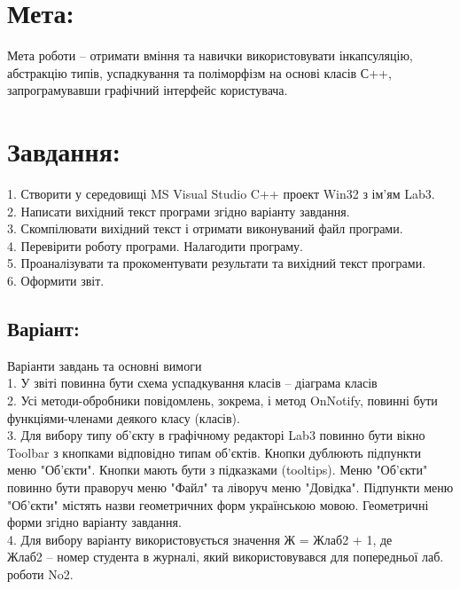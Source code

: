 \documentclass[14pt]{article}
\begin{document}

\tableofcontents
\newpage

\section{Мета:}
Мета роботи – отримати вміння та навички використовувати інкапсуляцію, абстракцію типів, успадкування та поліморфізм на основі класів С++, запрограмувавши графічний інтерфейс користувача.
\section{Завдання:}
1. Створити у середовищі MS Visual Studio C++ проект Win32 з ім’ям Lab3.\\
2. Написати вихідний текст програми згідно варіанту завдання.\\
3. Скомпілювати вихідний текст і отримати виконуваний файл програми.\\
4. Перевірити роботу програми. Налагодити програму.\\
5. Проаналізувати та прокоментувати результати та вихідний текст програми.\\
6. Оформити звіт.\\

\subsection{Варіант: }
Варіанти завдань та основні вимоги\\
1. У звіті повинна бути схема успадкування класів – діаграма класів\\
2. Усі методи-обробники повідомлень, зокрема, і метод OnNotify, повинні бути функціями-членами деякого класу (класів).\\
3. Для вибору типу об’єкту в графічному редакторі Lab3 повинно бути вікно Toolbar з кнопками відповідно типам об'єктів. Кнопки дублюють підпункти меню "Об’єкти". Кнопки мають бути з підказками (tooltips). Меню "Об’єкти" повинно бути праворуч меню "Файл" та ліворуч меню "Довідка". Підпункти меню "Об’єкти" містять назви геометричних форм українською мовою. Геометричні форми згідно варіанту завдання.\\
4. Для вибору варіанту використовується значення Ж = Жлаб2 + 1, де\\
Жлаб2 – номер студента в журналі, який використовувався для попередньої лаб. роботи No2.\\
\end{document}
